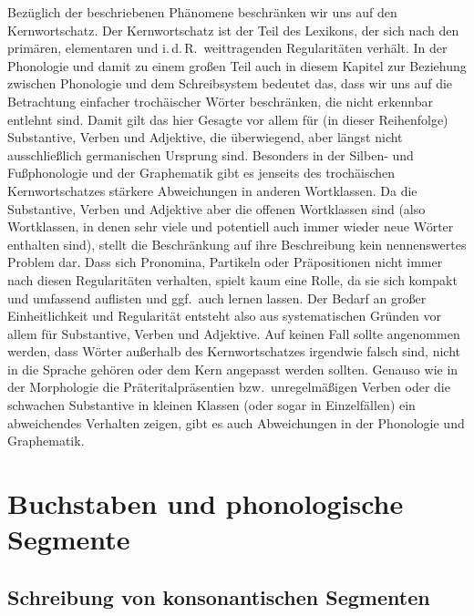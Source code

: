 Bezüglich der beschriebenen Phänomene beschränken wir uns auf den Kernwortschatz.
Der Kernwortschatz ist der Teil des Lexikons, der sich nach den primären, elementaren und i.\,d.\,R.\ weittragenden Regularitäten verhält.
In der Phonologie und damit zu einem großen Teil auch in diesem Kapitel zur Beziehung zwischen Phonologie und dem Schreibsystem bedeutet das, dass wir uns auf die Betrachtung einfacher trochäischer Wörter beschränken, die nicht erkennbar entlehnt sind.
Damit gilt das hier Gesagte vor allem für (in dieser Reihenfolge) Substantive, Verben und Adjektive, die überwiegend, aber längst nicht ausschließlich germanischen Ursprung sind.
Besonders in der Silben- und Fußphonologie und der Graphematik gibt es jenseits des trochäischen Kernwortschatzes stärkere Abweichungen in anderen Wortklassen.
Da die Substantive, Verben und Adjektive aber die offenen Wortklassen sind (also Wortklassen, in denen sehr viele und potentiell auch immer wieder neue Wörter enthalten sind), stellt die Beschränkung auf ihre Beschreibung kein nennenswertes Problem dar.
Dass sich Pronomina, Partikeln oder Präpositionen nicht immer nach diesen Regularitäten verhalten, spielt kaum eine Rolle, da sie sich kompakt und umfassend auflisten und ggf.\ auch lernen lassen.
Der Bedarf an großer Einheitlichkeit und Regularität entsteht also aus systematischen Gründen vor allem für Substantive, Verben und Adjektive.
Auf keinen Fall sollte angenommen werden, dass Wörter außerhalb des Kernwortschatzes irgendwie falsch sind, nicht in die Sprache gehören oder dem Kern angepasst werden sollten.
Genauso wie in der Morphologie die Präteritalpräsentien bzw.\ unregelmäßigen Verben oder die schwachen Substantive in kleinen Klassen (oder sogar in Einzelfällen) ein abweichendes Verhalten zeigen, gibt es auch Abweichungen in der Phonologie und Graphematik.

\section{Buchstaben und phonologische Segmente}

\label{sec:buchstabensegmente}

\subsection{Schreibung von konsonantischen Segmenten}

\label{sec:konssegschreib}


